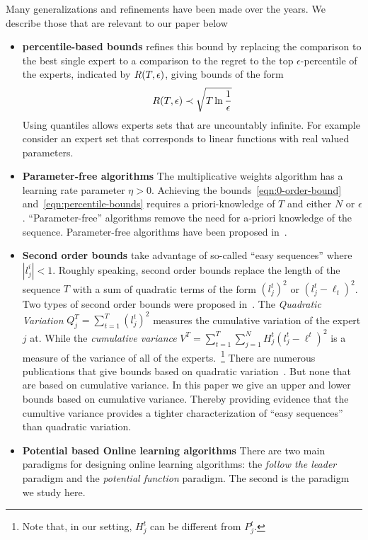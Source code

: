 \documentclass[anon,12pt]{colt2024} %
\begin{document}
Many generalizations and refinements have been made over the years. We
describe those that are relevant to our paper below
\begin{itemize}
\item{\bf percentile-based bounds} \cite{freund1999adaptive} refines
  this bound by replacing the comparison to the best single expert to
  a comparison to the regret to the top $\epsilon$-percentile of the
  experts, indicated by $R(T,\epsilon)$, giving bounds of the form
\begin{equation} \label{eqn:percentile-bounds}
R(T,\epsilon) \prec \sqrt{T \ln \frac{1}{\epsilon}}
\end{equation}
Using quantiles allows experts sets that are uncountably infinite.
For example consider an expert set that corresponds to linear
functions with real valued parameters.

\item{\bf Parameter-free algorithms} The multiplicative weights
  algorithm has a learning rate parameter $\eta>0$. Achieving the
  bounds~\ref{eqn:0-order-bound} and~\ref{eqn:percentile-bounds}
  requires a priori-knowledge of $T$ and either $N$ or       
  $\epsilon$. ``Parameter-free'' algorithms remove the need for
  a-priori knowledge of the sequence. Parameter-free algorithms have
  been proposed in~\cite{chaudhuri2009parameter,
    chernov2010prediction,orabona2016coin,cutkosky2018black}.

\item{\bf Second order bounds} take advantage of so-called ``easy
  sequences'' where $|l_j^i|<1$. Roughly speaking, second order bounds
  replace the length of the sequence $T$ with a sum of quadratic terms
  of the form $(l_j^t)^2$ or $(l_j^t-\ell_t)^2$. Two types of second
  order bounds were proposed in~\cite{cesa2007improved}.  The {\em
    Quadratic Variation} $Q_j^T=\sum_{t=1}^T (l_j^t)^2$ measures the
  cumulative variation of the expert $j$ at. While the {\em cumulative
    variance}
  $V^T = \sum_{t=1}^T \sum_{j=1}^N H^t_j (l_j^t - \ell^t)^2$ is a
  measure of the variance of all of the experts.~\footnote{Note that, in our setting, $H_j^t$ can be different from $P_j^t$.} There are numerous
  publications that give bounds based on quadratic
  variation~\cite{chernov2009prediction,hazan2010extracting,gaillard2014second,koolen2015second}. But
  none that are based on cumulative variance. In this paper we give an
  upper and lower bounds based on cumulative variance. Thereby
  providing evidence that the cumultive variance provides a tighter
  characterization of ``easy sequences'' than quadratic variation.
  
\item {\bf Potential based Online learning algorithms} There are two
  main paradigms for designing online learning algorithms: the {\em
    follow the leader} paradigm and the {\em potential function}
  paradigm.  The second is the paradigm we study here.  
\end{itemize}
\end{document}
